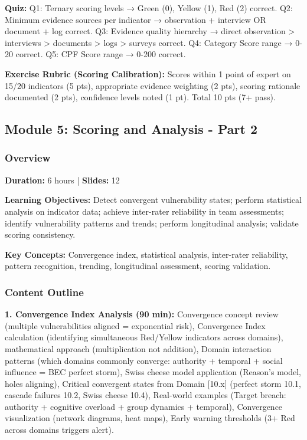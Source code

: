 \documentclass[11pt,a4paper]{article}
\begin{document}
\textbf{Quiz:} Q1: Ternary scoring levels → Green (0), Yellow (1), Red (2) correct. Q2: Minimum evidence sources per indicator → observation + interview OR document + log correct. Q3: Evidence quality hierarchy → direct observation > interviews > documents > logs > surveys correct. Q4: Category Score range → 0-20 correct. Q5: CPF Score range → 0-200 correct.

\textbf{Exercise Rubric (Scoring Calibration):} Scores within 1 point of expert on 15/20 indicators (5 pts), appropriate evidence weighting (2 pts), scoring rationale documented (2 pts), confidence levels noted (1 pt). Total 10 pts (7+ pass).

\subsection{Module 5: Scoring and Analysis - Part 2}

\subsubsection{Overview}
\textbf{Duration:} 6 hours | \textbf{Slides:} 12

\textbf{Learning Objectives:} Detect convergent vulnerability states; perform statistical analysis on indicator data; achieve inter-rater reliability in team assessments; identify vulnerability patterns and trends; perform longitudinal analysis; validate scoring consistency.

\textbf{Key Concepts:} Convergence index, statistical analysis, inter-rater reliability, pattern recognition, trending, longitudinal assessment, scoring validation.

\subsubsection{Content Outline}

\textbf{1. Convergence Index Analysis (90 min):} Convergence concept review (multiple vulnerabilities aligned = exponential risk), Convergence Index calculation (identifying simultaneous Red/Yellow indicators across domains), mathematical approach (multiplication not addition), Domain interaction patterns (which domains commonly converge: authority + temporal + social influence = BEC perfect storm), Swiss cheese model application (Reason's model, holes aligning), Critical convergent states from Domain [10.x] (perfect storm 10.1, cascade failures 10.2, Swiss cheese 10.4), Real-world examples (Target breach: authority + cognitive overload + group dynamics + temporal), Convergence visualization (network diagrams, heat maps), Early warning thresholds (3+ Red across domains triggers alert).
\end{document}
